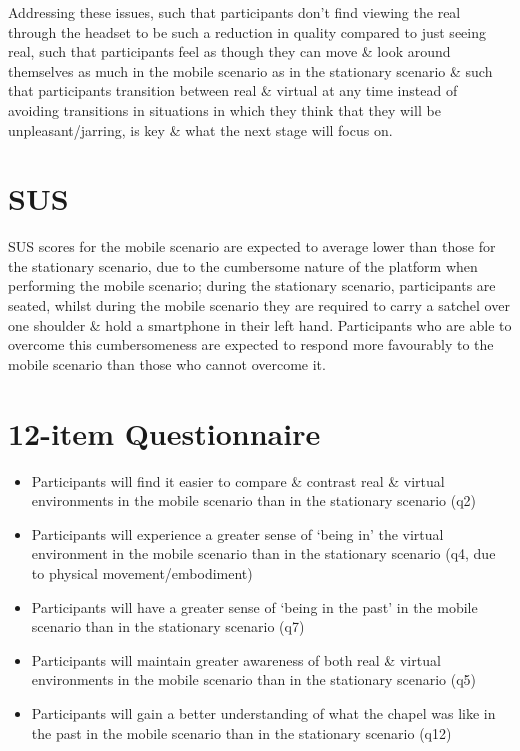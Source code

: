 Addressing these issues, such that participants don't find viewing the real through the headset to be such a reduction in quality compared to just seeing real, such that participants feel as though they can move \& look around themselves as much in the mobile scenario as in the stationary scenario \& such that participants transition between real \& virtual at any time instead of avoiding transitions in situations in which they think that they will be unpleasant/jarring, is key \& what the next stage will focus on.


\section{SUS}
SUS scores for the mobile scenario are expected to average lower than those for the stationary scenario, due to the cumbersome nature of the platform when performing the mobile scenario; during the stationary scenario, participants are seated, whilst during the mobile scenario they are required to carry a satchel over one shoulder \& hold a smartphone in their left hand. Participants who are able to overcome this cumbersomeness are expected to respond more favourably to the mobile scenario than those who cannot overcome it.

\section{12-item Questionnaire}
\begin{itemize}
	\item Participants will find it easier to compare \& contrast real \& virtual environments in the mobile scenario than in the stationary scenario (q2)
	\item Participants will experience a greater  sense of `being in' the virtual environment in the mobile scenario than in the stationary scenario (q4, due to physical movement/embodiment)
	\item Participants will have a greater sense of `being in the past' in the mobile scenario than in the stationary scenario (q7)
	\item Participants will maintain greater awareness of both real \& virtual environments in the mobile scenario than in the stationary scenario (q5)
	\item Participants will gain a better understanding of what the chapel was like in the past in the mobile scenario than in the stationary scenario (q12)
\end{itemize}

